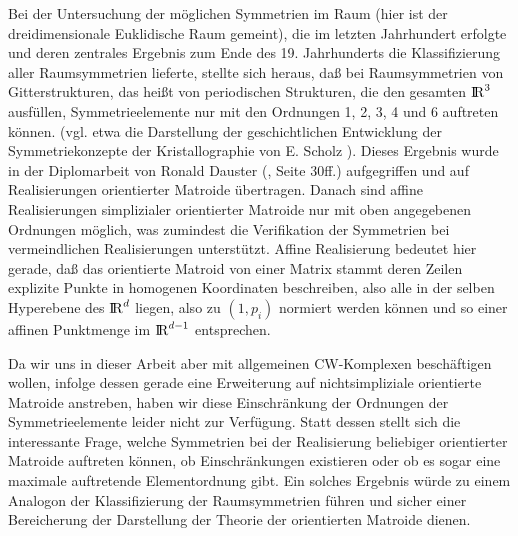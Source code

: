Bei der Untersuchung der möglichen Symmetrien im Raum (hier ist der
dreidimensionale Euklidische Raum gemeint), die im letzten Jahrhundert
erfolgte und deren zentrales Ergebnis zum Ende des 19. Jahrhunderts die
Klassifizierung aller Raumsymmetrien lieferte, stellte sich heraus, daß bei
Raumsymmetrien von Gitterstrukturen, das heißt von periodischen Strukturen,
die den gesamten $\mbox{$\rm I\!R$}^3$ ausfüllen, Symmetrieelemente nur mit den Ordnungen
1, 2, 3, 4 und 6 auftreten können. (vgl. etwa die Darstellung der
geschichtlichen Entwicklung der Symmetriekonzepte der Kristallographie von E.
Scholz \cite{Scho:89}). Dieses Ergebnis wurde in der Diplomarbeit von Ronald
Dauster (\cite{Dau:89}, Seite 30ff.) aufgegriffen und auf Realisierungen
orientierter Matroide übertragen. Danach sind affine Realisierungen
simplizialer orientierter Matroide nur mit oben angegebenen Ordnungen möglich,
was zumindest die Verifikation der Symmetrien bei vermeindlichen Realisierungen
unterstützt. Affine Realisierung bedeutet hier gerade, daß das orientierte
Matroid von einer Matrix stammt deren Zeilen explizite Punkte in homogenen
Koordinaten beschreiben, also alle in der selben Hyperebene des $\mbox{$\rm I\!R$}^d$ liegen,
also zu $(1,p_i)$ normiert werden können und so einer affinen Punktmenge
im $\mbox{$\rm I\!R$}^{d-1}$ entsprechen.

Da wir uns in dieser Arbeit aber mit allgemeinen CW-Komplexen beschäftigen
wollen, infolge dessen gerade eine Erweiterung auf nichtsimpliziale orientierte
Matroide anstreben, haben wir diese Einschränkung der Ordnungen der
Symmetrieelemente leider nicht zur Verfügung. Statt dessen stellt sich die
interessante Frage, welche Symmetrien bei der Realisierung beliebiger orientierter
Matroide auftreten können, ob Einschränkungen existieren oder ob es sogar eine
maximale auftretende Elementordnung gibt. Ein solches Ergebnis würde zu einem
Analogon der Klassifizierung der Raumsymmetrien führen und sicher einer
Bereicherung der Darstellung der Theorie der orientierten Matroide dienen.

